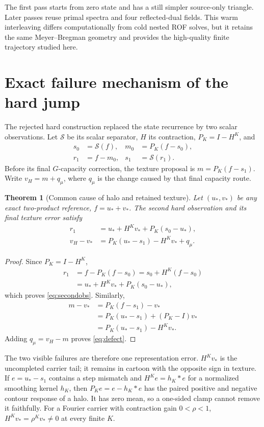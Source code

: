\documentclass[10pt,twocolumn]{article}
\newtheorem{theorem}[proposition]{Theorem}
\theoremstyle{definition}\newtheorem{remark}[proposition]{Remark}
\begin{document}
The first pass starts from zero state and has a still simpler source-only
triangle.  Later passes reuse primal spectra and four reflected-dual fields.
This warm interleaving differs computationally from cold nested ROF solves,
but it retains the same Meyer--Bregman geometry and provides the high-quality
finite trajectory studied here.

\section{Exact failure mechanism of the hard jump}

The rejected hard construction replaced the state recurrence by two scalar
observations.  Let $\mathcal S$ be its scalar separator, $H$ its contraction,
$P_K=I-H^K$, and
\begin{align}
s_0&=\mathcal S(f),&m_0&=P_K(f-s_0),\nonumber\\
r_1&=f-m_0,&s_1&=\mathcal S(r_1).
\end{align}
Before its final $G$-capacity correction, the texture proposal is
$m=P_K(f-s_1)$.  Write $v_H=m+q_\mu$, where $q_\mu$ is the change caused by
that final capacity route.

\begin{theorem}[Common cause of halo and retained texture]
Let $(u_*,v_*)$ be any exact two-product reference, $f=u_*+v_*$.  The second
hard observation and its final texture error satisfy
\begin{align}
r_1&=u_*+H^Kv_*+P_K(s_0-u_*),\label{eq:secondobs}\\
v_H-v_*&=P_K(u_*-s_1)-H^Kv_*+q_\mu .\label{eq:defect}
\end{align}
\end{theorem}
\begin{proof}
Since $P_K=I-H^K$,
\begin{align*}
r_1&=f-P_K(f-s_0)=s_0+H^K(f-s_0)\\
&=u_*+H^Kv_*+P_K(s_0-u_*),
\end{align*}
which proves \eqref{eq:secondobs}.  Similarly,
\begin{align*}
m-v_*&=P_K(f-s_1)-v_*\\
&=P_K(u_*-s_1)+(P_K-I)v_*\\
&=P_K(u_*-s_1)-H^Kv_*.
\end{align*}
Adding $q_\mu=v_H-m$ proves \eqref{eq:defect}.
\end{proof}

The two visible failures are therefore one representation error.
$H^Kv_*$ is the uncompleted carrier tail; it remains in cartoon with the
opposite sign in texture.  If $e=u_*-s_1$ contains a step mismatch and
$H^Ke=h_K*e$ for a normalized smoothing kernel $h_K$, then
$P_Ke=e-h_K*e$ has the paired positive and negative contour response of a
halo.  It has zero mean, so a one-sided clamp cannot remove it faithfully.
For a Fourier carrier with contraction gain $0<\rho<1$,
$H^Kv_*=\rho^Kv_*\ne0$ at every finite $K$.
\end{document}
